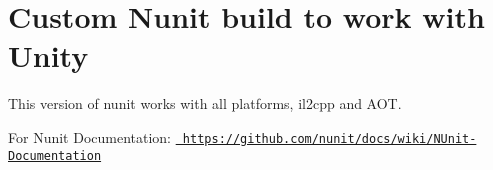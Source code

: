 \chapter{Custom Nunit build to work with Unity}
\hypertarget{md__library_2_package_cache_2com_8unity_8ext_8nunit_0d1_80_86_2_documentation_0i_2ext_8nunit}{}\label{md__library_2_package_cache_2com_8unity_8ext_8nunit_0d1_80_86_2_documentation_0i_2ext_8nunit}
\label{md__library_2_package_cache_2com_8unity_8ext_8nunit_0d1_80_86_2_documentation_0i_2ext_8nunit_autotoc_md208}%
%
 This version of nunit works with all platforms, il2cpp and  AOT.

For Nunit Documentation\+: \href{https://github.com/nunit/docs/wiki/NUnit-Documentation}{\texttt{ https\+://github.\+com/nunit/docs/wiki/\+NUnit-\/\+Documentation}} 